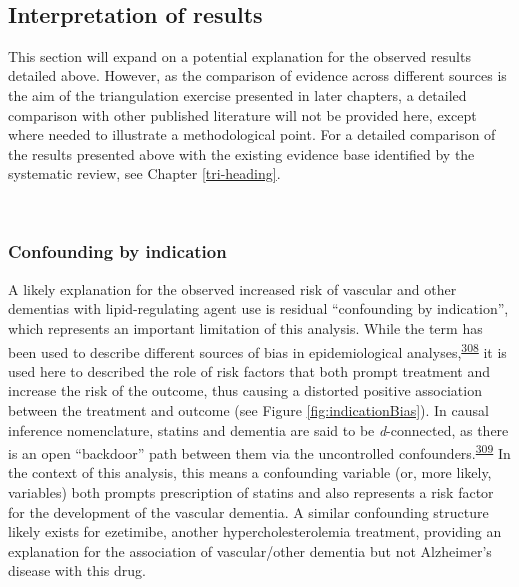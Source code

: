 \documentclass[a4paper, twoside]{templates/ociamthesis}
\begin{document}
~

\hypertarget{interpretation-of-results}{%
\subsection{Interpretation of results}\label{interpretation-of-results}}

This section will expand on a potential explanation for the observed results detailed above. However, as the comparison of evidence across different sources is the aim of the triangulation exercise presented in later chapters, a detailed comparison with other published literature will not be provided here, except where needed to illustrate a methodological point. For a detailed comparison of the results presented above with the existing evidence base identified by the systematic review, see Chapter \ref{tri-heading}.

~

\hypertarget{cprd-confounding-by-ind}{%
\subsubsection{Confounding by indication}\label{cprd-confounding-by-ind}}

A likely explanation for the observed increased risk of vascular and other dementias with lipid-regulating agent use is residual ``confounding by indication'', which represents an important limitation of this analysis. While the term has been used to describe different sources of bias in epidemiological analyses,\textsuperscript{\protect\hyperlink{ref-salas1999}{308}} it is used here to described the role of risk factors that both prompt treatment and increase the risk of the outcome, thus causing a distorted positive association between the treatment and outcome (see Figure \ref{fig:indicationBias}). In causal inference nomenclature, statins and dementia are said to be \emph{d}-connected, as there is an open ``backdoor'' path between them via the uncontrolled confounders.\textsuperscript{\protect\hyperlink{ref-suttorp2015}{309}} In the context of this analysis, this means a confounding variable (or, more likely, variables) both prompts prescription of statins and also represents a risk factor for the development of the vascular dementia. A similar confounding structure likely exists for ezetimibe, another hypercholesterolemia treatment, providing an explanation for the association of vascular/other dementia but not Alzheimer's disease with this drug.

~\\
\end{document}

